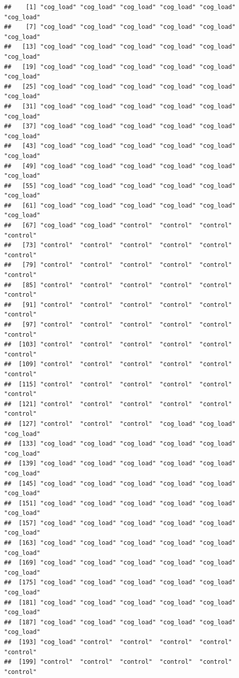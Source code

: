 \documentclass[
  american,
  man,floatsintext]{apa7}
\begin{document}
\begin{verbatim}
##    [1] "cog_load" "cog_load" "cog_load" "cog_load" "cog_load" "cog_load"
##    [7] "cog_load" "cog_load" "cog_load" "cog_load" "cog_load" "cog_load"
##   [13] "cog_load" "cog_load" "cog_load" "cog_load" "cog_load" "cog_load"
##   [19] "cog_load" "cog_load" "cog_load" "cog_load" "cog_load" "cog_load"
##   [25] "cog_load" "cog_load" "cog_load" "cog_load" "cog_load" "cog_load"
##   [31] "cog_load" "cog_load" "cog_load" "cog_load" "cog_load" "cog_load"
##   [37] "cog_load" "cog_load" "cog_load" "cog_load" "cog_load" "cog_load"
##   [43] "cog_load" "cog_load" "cog_load" "cog_load" "cog_load" "cog_load"
##   [49] "cog_load" "cog_load" "cog_load" "cog_load" "cog_load" "cog_load"
##   [55] "cog_load" "cog_load" "cog_load" "cog_load" "cog_load" "cog_load"
##   [61] "cog_load" "cog_load" "cog_load" "cog_load" "cog_load" "cog_load"
##   [67] "cog_load" "cog_load" "control"  "control"  "control"  "control" 
##   [73] "control"  "control"  "control"  "control"  "control"  "control" 
##   [79] "control"  "control"  "control"  "control"  "control"  "control" 
##   [85] "control"  "control"  "control"  "control"  "control"  "control" 
##   [91] "control"  "control"  "control"  "control"  "control"  "control" 
##   [97] "control"  "control"  "control"  "control"  "control"  "control" 
##  [103] "control"  "control"  "control"  "control"  "control"  "control" 
##  [109] "control"  "control"  "control"  "control"  "control"  "control" 
##  [115] "control"  "control"  "control"  "control"  "control"  "control" 
##  [121] "control"  "control"  "control"  "control"  "control"  "control" 
##  [127] "control"  "control"  "control"  "cog_load" "cog_load" "cog_load"
##  [133] "cog_load" "cog_load" "cog_load" "cog_load" "cog_load" "cog_load"
##  [139] "cog_load" "cog_load" "cog_load" "cog_load" "cog_load" "cog_load"
##  [145] "cog_load" "cog_load" "cog_load" "cog_load" "cog_load" "cog_load"
##  [151] "cog_load" "cog_load" "cog_load" "cog_load" "cog_load" "cog_load"
##  [157] "cog_load" "cog_load" "cog_load" "cog_load" "cog_load" "cog_load"
##  [163] "cog_load" "cog_load" "cog_load" "cog_load" "cog_load" "cog_load"
##  [169] "cog_load" "cog_load" "cog_load" "cog_load" "cog_load" "cog_load"
##  [175] "cog_load" "cog_load" "cog_load" "cog_load" "cog_load" "cog_load"
##  [181] "cog_load" "cog_load" "cog_load" "cog_load" "cog_load" "cog_load"
##  [187] "cog_load" "cog_load" "cog_load" "cog_load" "cog_load" "cog_load"
##  [193] "cog_load" "control"  "control"  "control"  "control"  "control" 
##  [199] "control"  "control"  "control"  "control"  "control"  "control" 

\end{verbatim}
\end{document}
